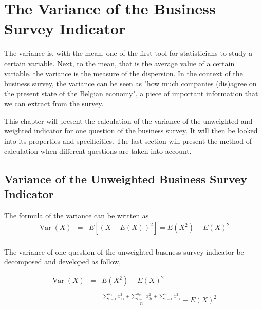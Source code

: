 \documentclass[12pt,a4paper,oneside]{book}
\DeclareMathOperator{\Var}{Var}
\begin{document}
\chapter{The Variance of the Business Survey Indicator}

The variance is, with the mean, one of the first tool for statisticians to study a certain variable. 
Next, to the mean, that is the average value of a certain variable, the variance is the measure of the dispersion. 
In the context of the business survey, the variance can be seen as "how much companies (dis)agree on the present state of the Belgian economy", a piece of important information that we can extract from the survey.


This chapter will present the calculation of the variance of the unweighted and weighted indicator for one question of the business survey. It will then be looked into its properties and specificities.
The last section will present the method of calculation when different questions are taken into account.

\section{Variance of the Unweighted Business Survey Indicator}

\nocite{alcaniz_calculation_2006}

The formula of the variance can be written as 
\begin{eqnarray}
         \Var(X) &=& E \left[ \left(X-E(X) \right)^2 \right] =  E\left( X^2\right) - E\left( X\right)^2 \\ \nonumber
\end{eqnarray}

The variance of one question of the unweighted business survey indicator be decomposed and developed as follow,

\begin{eqnarray}
\Var(X) &=&  E\left( X^2\right) - E\left( X\right)^2 \nonumber \\ \nonumber \\
    &=&  \frac{\sum_{i=1}^{n_+} x_{+i}^2  +  \sum_{i=1}^{n_0} x_{0i}^2 + \sum_{i=1}^{n_-} x_{-i}^2}{n}  - E(X)^2 \\ \nonumber
\end{eqnarray}
\end{document}
